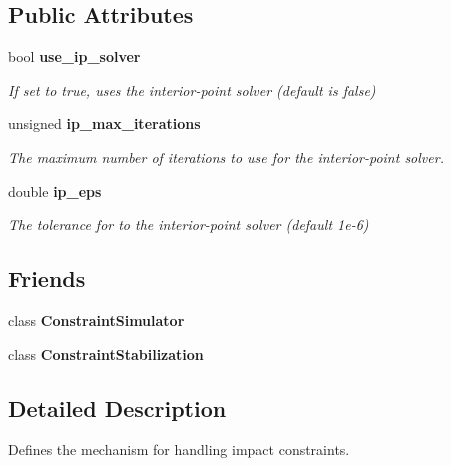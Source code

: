 \subsection*{Public Attributes}
\begin{DoxyCompactItemize}
\item 
bool {\bf use\-\_\-ip\-\_\-solver}\label{classMoby_1_1ImpactConstraintHandler_a6f4ce97931e1fdb5e44a3bf81f495b70}

\begin{DoxyCompactList}\small\item\em If set to true, uses the interior-\/point solver (default is false) \end{DoxyCompactList}\item 
unsigned {\bf ip\-\_\-max\-\_\-iterations}\label{classMoby_1_1ImpactConstraintHandler_af221288cc733bff24adf5ca4bd5b1b05}

\begin{DoxyCompactList}\small\item\em The maximum number of iterations to use for the interior-\/point solver. \end{DoxyCompactList}\item 
double {\bf ip\-\_\-eps}\label{classMoby_1_1ImpactConstraintHandler_a46702536fd126e572b11d1f4f941a4d6}

\begin{DoxyCompactList}\small\item\em The tolerance for to the interior-\/point solver (default 1e-\/6) \end{DoxyCompactList}\end{DoxyCompactItemize}
\subsection*{Friends}
\begin{DoxyCompactItemize}
\item 
class {\bfseries Constraint\-Simulator}\label{classMoby_1_1ImpactConstraintHandler_ad5cb48502cbb12b1612870bcf90fca8e}

\item 
class {\bfseries Constraint\-Stabilization}\label{classMoby_1_1ImpactConstraintHandler_a320e2b5d0cb83071af150f47d50ca127}

\end{DoxyCompactItemize}


\subsection{Detailed Description}
Defines the mechanism for handling impact constraints. 

